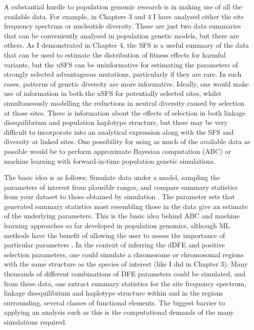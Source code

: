 	A substantial hurdle to population genomic research is in making use of all the available data. For example, in Chapters 3 and 4 I have analysed either the site frequency spectrum or nucleotide diversity. These are just two data summaries that can be conveniently analysed in  population genetic models, but there are others. As I demonstrated in Chapter 4, the SFS is a useful summary of the data that can be used to estimate the distribution of fitness effects for harmful variants, but the uSFS can be uninformative for estimating the parameters of strongly selected advantageous mutations, particularly if they are rare. In such cases, patterns of genetic diversity are more informative. Ideally, one would make use of information in both the uSFS for potentially selected sites, whilst simultaneously modelling the reductions in neutral diversity caused by selection at those sites. There is information about the effects of selection in both linkage disequilibrium and population haplotype structure, but these may be very difficult to incorporate into an analytical expression along with the SFS and diversity at linked sites. One possibility for using as much of the available data as possible would be to perform approximate Bayesian computation (ABC) or machine learning with forward-in-time population genetic simulations.

	The basic idea is as follows: Simulate data under a model, sampling the parameters of interest from  plausible ranges, and compare summary statistics from your dataset to those obtained by simulation \citep{RN356}. The parameter sets that generated summary statistics most resembling those in the data give an estimate of the underlying parameters. This is the basic idea behind ABC and machine learning approaches so far developed in population genomics, although ML methods have the benefit of allowing the user to assess the importance of particular parameters \citep{RN377}. In the context of inferring the dDFE and positive selection parameters, one could simulate a chromosome or chromosomal regions with the same structure as the species of interest (like I did in Chapter 3). Many thousands of different combinations of DFE parameters could be simulated, and from these data, one extract summary statistics for the site frequency spectrum, linkage disequilibrium and haplotype structure within and in the regions surrounding, several classes of functional elements. The biggest barrier to applying an analysis such as this is the computational demands of the many simulations required.

